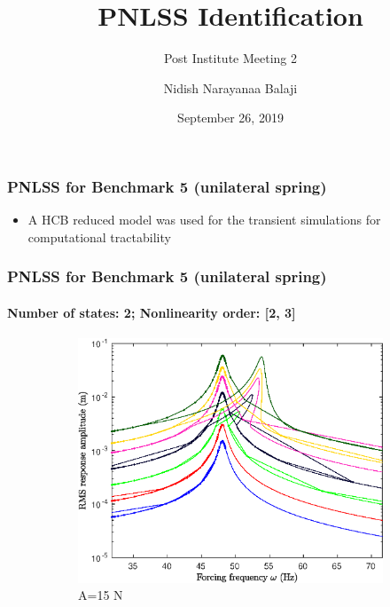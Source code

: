 \documentclass[aspectratio=169]{beamer}
\title{PNLSS Identification}
\subtitle{Post Institute Meeting 2}
\author[Balaji, N. N.]{Nidish Narayanaa Balaji}
\institute[Rice U.]{Rice University, Houston, TX 77005}
\date{September 26, 2019}
\begin{document}
\maketitle{}

\begin{frame}
  \frametitle{PNLSS for Benchmark 5 (unilateral spring)}
  \begin{itemize}
  \item A HCB reduced model was used for the transient simulations for
    computational tractability
  \end{itemize}
\end{frame}

\begin{frame}
  \frametitle{PNLSS for Benchmark 5 (unilateral spring)}
  \framesubtitle{Number of states: 2; Nonlinearity order: [2, 3]}
  \begin{figure}
    \centering
    \begin{subfigure}{0.25\linewidth}
      \includegraphics[width=\linewidth]{../../benchmark5/FIGURES/pnlssfrf_Amp_b5_A15_up4_ms_full_na2_nx23}
      \caption{A=15 N}
    \end{subfigure}%
    \begin{subfigure}{0.25\linewidth}

\end{subfigure}
\end{figure}
\end{frame}
\end{document}
